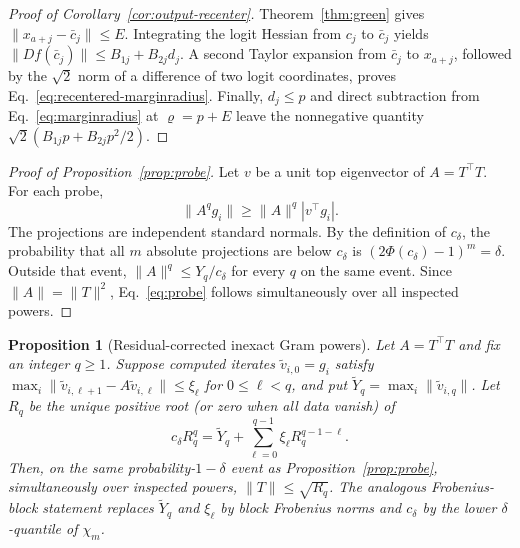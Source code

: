 \documentclass{article}
\newtheorem{proposition}{Proposition}
\begin{document}
\begin{proof}[Proof of Corollary~\ref{cor:output-recenter}]
Theorem~\ref{thm:green} gives
$\|x_{a+j}-\bar c_j\|\le E$.  Integrating the logit Hessian from $c_j$ to
$\bar c_j$ yields
$\|Df(\bar c_j)\|\le B_{1j}+B_{2j}d_j$.  A second Taylor expansion from
$\bar c_j$ to $x_{a+j}$, followed by the $\sqrt2$ norm of a difference of two
logit coordinates, proves Eq.~\eqref{eq:recentered-marginradius}.  Finally,
$d_j\le p$ and direct subtraction from Eq.~\eqref{eq:marginradius} at
$\varrho=p+E$ leave the nonnegative quantity
$\sqrt2(B_{1j}p+B_{2j}p^2/2)$.
\end{proof}

\begin{proof}[Proof of Proposition~\ref{prop:probe}]
Let $v$ be a unit top eigenvector of $A=T^\top T$.  For each probe,
\begin{equation}
 \lVert A^qg_i\rVert\ge\lVert A\rVert^q|v^\top g_i|.
\end{equation}
The projections are independent standard normals.  By the definition of
$c_\delta$, the probability that all $m$ absolute projections are below
$c_\delta$ is
$(2\Phi(c_\delta)-1)^m=\delta$.  Outside that event,
$\lVert A\rVert^q\le Y_q/c_\delta$ for every $q$ on the same event.  Since
$\lVert A\rVert=\lVert T\rVert^2$, Eq.~\eqref{eq:probe} follows
simultaneously over all inspected powers.
\end{proof}

\begin{proposition}[Residual-corrected inexact Gram powers]
\label{prop:inexact-probe}
Let $A=T^\top T$ and fix an integer $q\ge1$.  Suppose computed iterates
$\widetilde v_{i,0}=g_i$ satisfy
$\max_i\|\widetilde v_{i,\ell+1}-A\widetilde v_{i,\ell}\|\le\xi_\ell$
for $0\le\ell<q$, and put
$\widetilde Y_q=\max_i\|\widetilde v_{i,q}\|$.  Let $R_q$ be the unique
positive root (or zero when all data vanish) of
\begin{equation}
c_\delta R_q^q=\widetilde Y_q+
 \sum_{\ell=0}^{q-1}\xi_\ell R_q^{q-1-\ell}.
\label{eq:inexact-gram}
\end{equation}
Then, on the same probability-$1-\delta$ event as
Proposition~\ref{prop:probe}, simultaneously over inspected powers,
$\|T\|\le\sqrt{R_q}$.  The analogous Frobenius-block statement replaces
$\widetilde Y_q$ and $\xi_\ell$ by block Frobenius norms and $c_\delta$ by the
lower $\delta$-quantile of $\chi_m$.
\end{proposition}
\end{document}
